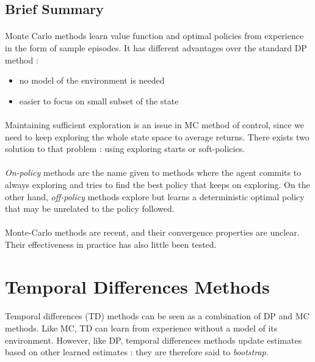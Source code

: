 \documentclass[a4paper]{article}
\begin{document}
{{			\subsection{Brief Summary}
			{
				\paragraph{} Monte Carlo methods learn value function and optimal policies from experience in the form of sample episodes. It has different advantages over the standard DP method : 
				\begin{itemize}
					\item no model of the environment is needed
					\item easier to focus on small subset of the state
				\end{itemize}
				
				\paragraph{} Maintaining sufficient exploration is an issue in MC method of control, since we need to keep exploring the whole state space to average returns. There exists two solution to that problem : using exploring starts or soft-policies. 
				
				\paragraph{} \emph{On-policy} methods are the name given to methods where the agent commits to always exploring and tries to find the best policy that keeps on exploring. On the other hand, \emph{off-policy} methods explore but learns a deterministic optimal policy that may be unrelated to the policy followed. 
				
				\paragraph{} Monte-Carlo methods are recent, and their convergence properties are unclear. Their effectiveness in practice has also little been tested. 
			}
		}
		\newpage
		
		\section{Temporal Differences Methods}
		{
			\paragraph{} Temporal differences (TD) methods can be seen as a combination of DP and MC methods. Like MC, TD can learn from experience without a model of its environment. However, like DP, temporal differences methods update estimates based on other learned estimates : they are therefore said to \emph{bootstrap}. 
			
}}
\end{document}
